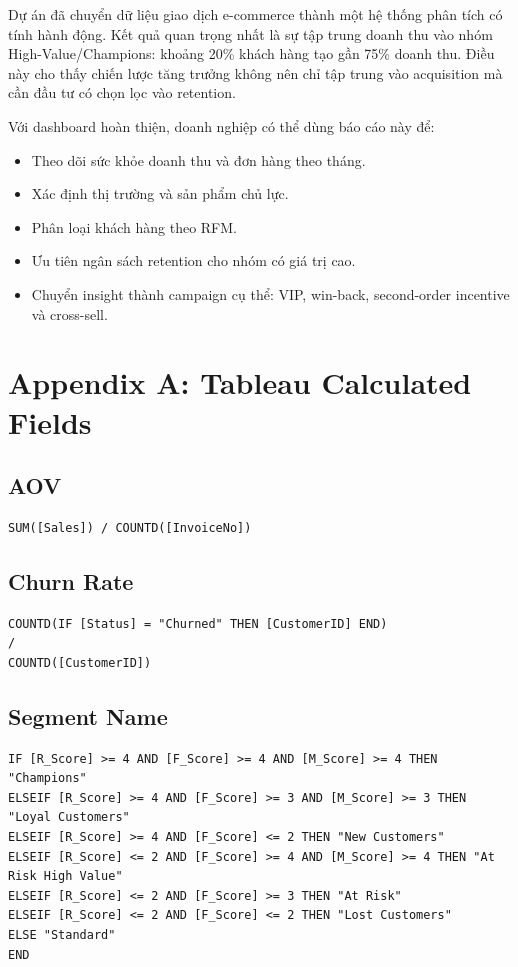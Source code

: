 \documentclass[11pt,a4paper]{article}
\begin{document}
Dự án đã chuyển dữ liệu giao dịch e-commerce thành một hệ thống phân tích có tính hành động. Kết quả quan trọng nhất là sự tập trung doanh thu vào nhóm High-Value/Champions: khoảng 20\% khách hàng tạo gần 75\% doanh thu. Điều này cho thấy chiến lược tăng trưởng không nên chỉ tập trung vào acquisition mà cần đầu tư có chọn lọc vào retention.

Với dashboard hoàn thiện, doanh nghiệp có thể dùng báo cáo này để:

\begin{itemize}
    \item Theo dõi sức khỏe doanh thu và đơn hàng theo tháng.
    \item Xác định thị trường và sản phẩm chủ lực.
    \item Phân loại khách hàng theo RFM.
    \item Ưu tiên ngân sách retention cho nhóm có giá trị cao.
    \item Chuyển insight thành campaign cụ thể: VIP, win-back, second-order incentive và cross-sell.
\end{itemize}

\newpage
\appendix
\section{Appendix A: Tableau Calculated Fields}

\subsection{AOV}
\begin{lstlisting}
SUM([Sales]) / COUNTD([InvoiceNo])
\end{lstlisting}

\subsection{Churn Rate}
\begin{lstlisting}
COUNTD(IF [Status] = "Churned" THEN [CustomerID] END)
/
COUNTD([CustomerID])
\end{lstlisting}

\subsection{Segment Name}
\begin{lstlisting}
IF [R_Score] >= 4 AND [F_Score] >= 4 AND [M_Score] >= 4 THEN "Champions"
ELSEIF [R_Score] >= 4 AND [F_Score] >= 3 AND [M_Score] >= 3 THEN "Loyal Customers"
ELSEIF [R_Score] >= 4 AND [F_Score] <= 2 THEN "New Customers"
ELSEIF [R_Score] <= 2 AND [F_Score] >= 4 AND [M_Score] >= 4 THEN "At Risk High Value"
ELSEIF [R_Score] <= 2 AND [F_Score] >= 3 THEN "At Risk"
ELSEIF [R_Score] <= 2 AND [F_Score] <= 2 THEN "Lost Customers"
ELSE "Standard"
END
\end{lstlisting}
\end{document}
